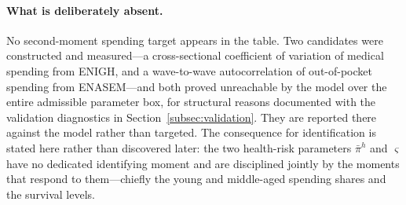 \documentclass[12pt,a4paper]{article}
\begin{document}
\paragraph{What is deliberately absent.} No second-moment spending target appears in the table. Two candidates were constructed and measured---a cross-sectional coefficient of variation of medical spending from ENIGH, and a wave-to-wave autocorrelation of out-of-pocket spending from ENASEM---and both proved unreachable by the model over the entire admissible parameter box, for structural reasons documented with the validation diagnostics in Section~\ref{subsec:validation}. They are reported there against the model rather than targeted. The consequence for identification is stated here rather than discovered later: the two health-risk parameters $\bar\pi^h$ and $\varsigma$ have no dedicated identifying moment and are disciplined jointly by the moments that respond to them---chiefly the young and middle-aged spending shares and the survival levels.
\end{document}

